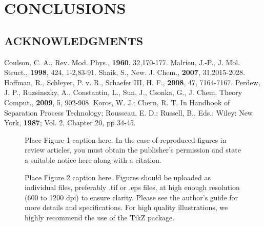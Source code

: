 \documentclass[12pt]{article}
\begin{document}
\section*{\sffamily \Large CONCLUSIONS}


\subsection*{\sffamily \large ACKNOWLEDGMENTS}




\clearpage



\begin{thebibliography}{99}


Coulson, C. A., Rev. Mod. Phys., \textbf{1960}, 32,170-177.
Malrieu, J.-P., J. Mol. Struct., \textbf{1998}, 424, 1-2,83-91.
Shaik, S., New. J. Chem., \textbf{2007}, 31,2015-2028.
Hoffman, R., Schleyer, P. v. R., Schaefer III, H. F., \textbf{2008}, 47, 7164-7167.
Perdew, J. P., Ruzsinszky, A., Constantin, L., Sun, J., Csonka, G., J. Chem. Theory Comput., \textbf{2009}, 5, 902-908.
Koros, W. J.; Chern, R. T. In Handbook of Separation Process Technology; Rousseau, E. D.; Russell, B., Eds.; Wiley: New York, \textbf{1987}; Vol. 2, Chapter 20, pp 34-45.
\end{thebibliography}



\clearpage

\begin{figure}
\caption{\label{cc} Place Figure 1 caption here. In the case of reproduced figures in review articles, you must obtain the publisher's permission and state a suitable notice here along with a citation.}
\end{figure}

\begin{figure}
\caption{\label{fig2} Place Figure 2 caption here. Figures should be uploaded as individual files, preferably .tif or .eps files, at high enough resolution (600 to 1200 dpi) to ensure clarity. Please see the author’s guide for more details and specifications. For high quality illustrations, we highly recommend the use of the TikZ package.}
\end{figure}
\end{document}

